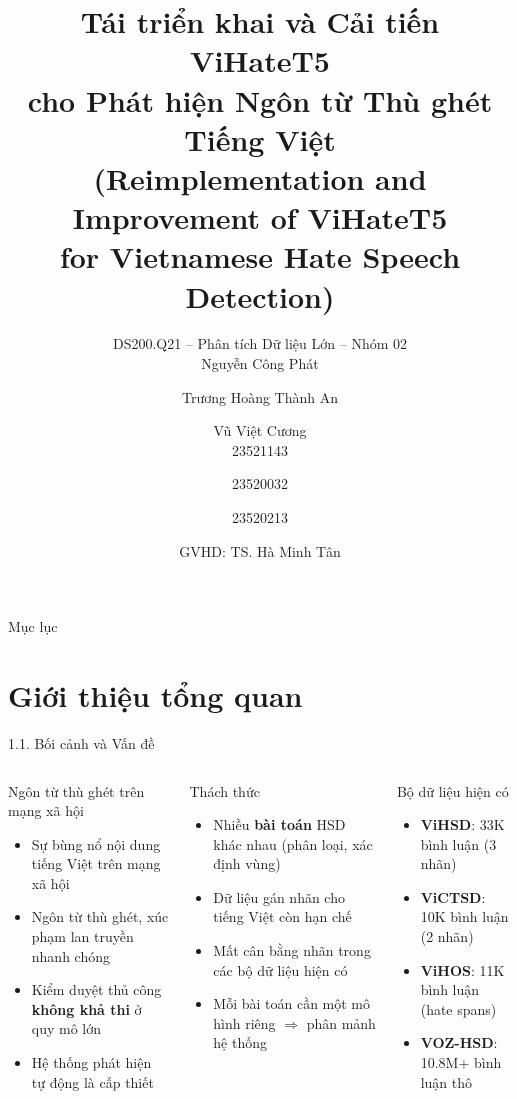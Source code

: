 \documentclass[11pt, aspectratio=169]{beamer}
\title[ViHateT5]{\textbf{Tái triển khai và Cải tiến ViHateT5 \\ cho Phát hiện Ngôn từ Thù ghét Tiếng Việt} \\ \textbf{(Reimplementation and Improvement of ViHateT5 \\ for Vietnamese Hate Speech Detection)}}
\author[DS200.Q21]{DS200.Q21 -- Phân tích Dữ liệu Lớn -- Nhóm 02 \\[0.3em]
Nguyễn Công Phát \and Trương Hoàng Thành An \and Vũ Việt Cương \\
23521143 \and 23520032 \and 23520213}
\institute[UIT]{Trường Đại học Công nghệ Thông tin -- ĐHQG TP.HCM}
\date{GVHD: TS. Hà Minh Tân}
\begin{document}
\begin{frame}[plain]
  \titlepage
\end{frame}

\begin{frame}{Mục lục}
  \tableofcontents
\end{frame}

\section{Giới thiệu tổng quan}

\begin{frame}[fragile, shrink=10]{1.1. Bối cảnh và Vấn đề}
\begin{columns}[T]
  \begin{block}{Ngôn từ thù ghét trên mạng xã hội}
    \begin{itemize}
      \item Sự bùng nổ nội dung tiếng Việt trên mạng xã hội
      \item Ngôn từ thù ghét, xúc phạm lan truyền nhanh chóng
      \item Kiểm duyệt thủ công \textbf{không khả thi} ở quy mô lớn
      \item Hệ thống phát hiện tự động là cấp thiết
    \end{itemize}
  \end{block}

  \begin{block}{Thách thức}
    \begin{itemize}
      \item Nhiều \textbf{bài toán} HSD khác nhau (phân loại, xác định vùng)
      \item Dữ liệu gán nhãn cho tiếng Việt còn hạn chế
      \item Mất cân bằng nhãn trong các bộ dữ liệu hiện có
      \item Mỗi bài toán cần một mô hình riêng $\Rightarrow$ phân mảnh hệ thống
    \end{itemize}
  \end{block}

  \begin{block}{Bộ dữ liệu hiện có}
    \begin{itemize}
      \item \textbf{ViHSD}: 33K bình luận (3 nhãn)
      \item \textbf{ViCTSD}: 10K bình luận (2 nhãn)
      \item \textbf{ViHOS}: 11K bình luận (hate spans)
      \item \textbf{VOZ-HSD}: 10.8M+ bình luận thô
    \end{itemize}
  \end{block}


\end{columns}
\end{frame}
\end{document}
